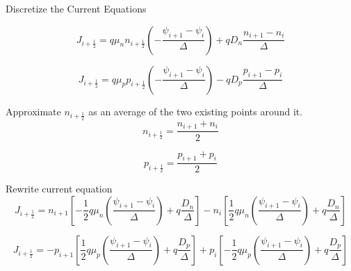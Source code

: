 \documentclass[12pt]{article}
\begin{document}
Discretize the Current Equations

\begin{equation}
J_{i+\frac{1}{2}}=
q\mu_{n}n_{i+\frac{1}{2}}(-\frac{\psi_{i+1}-\psi_{i}}{\Delta})+
qD_{n}\frac{n_{i+1}-n_{i}}{\Delta}
\end{equation}

\begin{equation}
J_{i+\frac{1}{2}}=
q\mu_{p}p_{i+\frac{1}{2}}(-\frac{\psi_{i+1}-\psi_{i}}{\Delta})-
qD_{p}\frac{p_{i+1}-p_{i}}{\Delta}
\end{equation}


Approximate $ n_{i+\frac{1}{2}} $ as an average of the two existing points around it.
\begin{equation}
n_{i+\frac{1}{2}}=\frac{n_{i+1}+n_{i}}{2}
\end{equation}

\begin{equation}
p_{i+\frac{1}{2}}=\frac{p_{i+1}+p_{i}}{2}
\end{equation}

Rewrite current equation
\begin{equation}
J_{i+\frac{1}{2}}=
n_{i+1}[-\frac{1}{2}q\mu_{n}(\frac{\psi_{i+1}-\psi_{i}}{\Delta})+q\frac{D_{n}}{\Delta}]-
n_{i}[\frac{1}{2}q\mu_{n}(\frac{\psi_{i+1}-\psi_{i}}{\Delta})+q\frac{D_{n}}{\Delta}]
\end{equation}

\begin{equation}
J_{i+\frac{1}{2}}=
-p_{i+1}[\frac{1}{2}q\mu_{p}(\frac{\psi_{i+1}-\psi_{i}}{\Delta})+q\frac{D_{p}}{\Delta}]+
p_{i}[-\frac{1}{2}q\mu_{p}(\frac{\psi_{i+1}-\psi_{i}}{\Delta})+q\frac{D_{p}}{\Delta}]
\end{equation}
\end{document}
